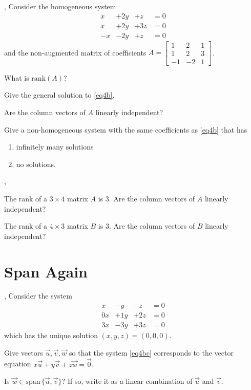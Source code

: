 \documentclass[letter]{article}
\newcommand{\Span}{\mathrm{span}\,}
\newcommand{\Rank}{\mathrm{rank}}
\newcommand{\mat}[1]{\begin{bmatrix}#1\end{bmatrix}}
\begin{document}
	\sep
	Consider the homogeneous system 
		\begin{equation}\label{eq4b}
			\begin{array}{llll}
				x&+2y&+z &= 0\\
				x&+2y&+3z &= 0\\
				-x&-2y&+z &= 0
			\end{array}
		\end{equation}
	and the non-augmented matrix of coefficients $A=\mat{1&2&1\\1&2&3\\-1&-2&1}$.
	\begin{Enum}
		\item What is $\Rank(A)$?
		\item Give the general solution to \eqref{eq4b}.
		\item Are the column vectors of $A$ linearly independent?
		\item Give a non-homogeneous system with the same coefficients as \eqref{eq4b} that has
			\begin{enumerate}
				\item infinitely many solutions
				\item no solutions.
			\end{enumerate}
	\end{Enum}

	\sep
	\vspace{-1cm}
	\begin{Enum}
		\item The rank of a $3\times 4$ matrix $A$ is $3$.  Are the column vectors of $A$ linearly independent?
		\item The rank of a $4\times 3$ matrix $B$ is $3$.  Are the column vectors of $B$ linearly independent?
	\end{Enum}

\section*{Span Again}
	\sep
	Consider the system 
		\begin{equation}\label{eq4bc}
			\begin{array}{llll}
				x&-y&-z &= 0\\
				0x&+1y&+2z &= 0\\
				3x&-3y&+3z &= 0
			\end{array}
		\end{equation}
	which has the unique solution $(x,y,z)=(0,0,0)$.
	\begin{Enum}
		\item Give vectors $\vec u,\vec v,\vec w$ so that the system \eqref{eq4bc}
			corresponds to the vector equation $x\vec u+y\vec v+z\vec w = \vec 0$.
		\item Is $\vec w\in\Span\{\vec u,\vec v\}$? If so, write it as a linear combination
			of $\vec u$ and $\vec v$.
	\end{Enum}
\end{document}
